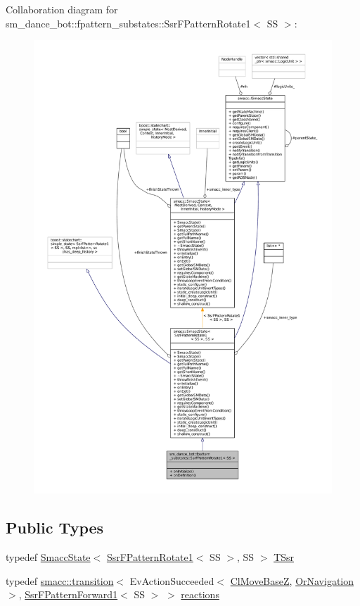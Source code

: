 Collaboration diagram for sm\+\_\+dance\+\_\+bot\+:\+:fpattern\+\_\+substates\+:\+:Ssr\+F\+Pattern\+Rotate1$<$ SS $>$\+:
\nopagebreak
\begin{figure}[H]
\begin{center}
\leavevmode
\includegraphics[width=350pt]{structsm__dance__bot_1_1fpattern__substates_1_1SsrFPatternRotate1__coll__graph}
\end{center}
\end{figure}
\subsection*{Public Types}
\begin{DoxyCompactItemize}
\item 
typedef \hyperlink{classSmaccState}{Smacc\+State}$<$ \hyperlink{structsm__dance__bot_1_1fpattern__substates_1_1SsrFPatternRotate1}{Ssr\+F\+Pattern\+Rotate1}$<$ SS $>$, SS $>$ \hyperlink{structsm__dance__bot_1_1fpattern__substates_1_1SsrFPatternRotate1_ac3c40083e6ee2baf777d0af9639457f2}{T\+Ssr}
\item 
typedef \hyperlink{classsmacc_1_1transition}{smacc\+::transition}$<$ Ev\+Action\+Succeeded$<$ \hyperlink{classmove__base__z__client_1_1ClMoveBaseZ}{Cl\+Move\+BaseZ}, \hyperlink{classsm__dance__bot_1_1OrNavigation}{Or\+Navigation} $>$, \hyperlink{structsm__dance__bot_1_1fpattern__substates_1_1SsrFPatternForward1}{Ssr\+F\+Pattern\+Forward1}$<$ SS $>$ $>$ \hyperlink{structsm__dance__bot_1_1fpattern__substates_1_1SsrFPatternRotate1_add5b3ec16a787f6318d21b8801aee5ef}{reactions}
\end{DoxyCompactItemize}
